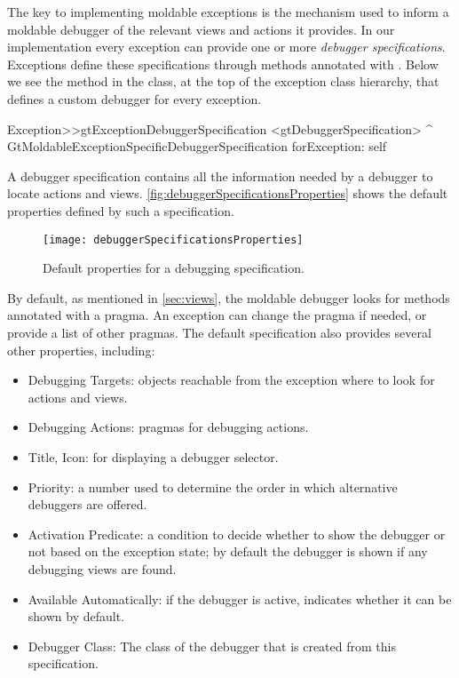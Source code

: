 \documentclass[sigplan,screen]{acmart} %
\newcommand{\GT}{\lst{GT}\xspace} %
\begin{document}
The key to implementing moldable exceptions is the mechanism used to inform a moldable debugger of the relevant views and actions it provides.
In our implementation every exception can provide one or more \emph{debugger specifications}.
Exceptions define these specifications through methods annotated with .
Below we see the method in the  class, at the top of the exception class hierarchy, that defines a custom debugger for every exception.

\begin{code}
Exception>>gtExceptionDebuggerSpecification
	<gtDebuggerSpecification>
	^ GtMoldableExceptionSpecificDebuggerSpecification
		forException: self
\end{code}

A debugger specification contains all the information needed by a debugger to locate actions and views.
\autoref{fig:debuggerSpecificationsProperties} shows the default properties defined by such a specification.

\begin{figure}[h]
  \texttt{[image: debuggerSpecificationsProperties]}
  \caption{Default properties for a debugging specification.}
  \label{fig:debuggerSpecificationsProperties}
\end{figure}

By default, as mentioned in \autoref{sec:views}, the moldable \GT debugger looks for methods annotated with a  pragma.
An exception can change the pragma if needed, or provide a list of other pragmas.
The default specification also provides several other properties, including:
\begin{itemize}
\item Debugging Targets: objects reachable from the exception where to look for actions and views.
\item Debugging Actions: pragmas for debugging actions.
\item Title, Icon: for displaying a debugger selector.
\item Priority: a number used to determine the order in which alternative debuggers are offered.
\item Activation Predicate: a condition to decide whether to show the debugger or not based on the exception state; by default the debugger is shown if any debugging views are found.
\item Available Automatically: if the debugger is active, indicates whether it can be shown by default.
\item Debugger Class: The class of the debugger that is created from this specification.
\end{itemize}
\end{document}
